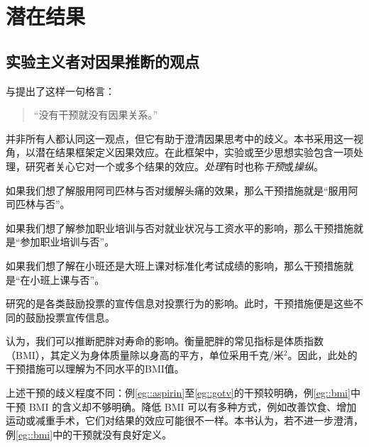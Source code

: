 \chapter{潜在结果}
 \label{chapter::potential-outcomes}


\section{实验主义者对因果推断的观点}






\citet{rubin1975bayesian}与\citet{holland1986statistics}提出了这样一句格言：
\begin{quote}
“没有干预就没有因果关系。”
\end{quote}
并非所有人都认同这一观点，但它有助于澄清因果思考中的歧义。本书采用这一视角，以潜在结果框架定义因果效应\citep{Neyman:1923, Rubin:1974}。在此框架中，实验或至少思想实验包含一项处理，研究者关心它对一个或多个结果的效应。{\it 处理}有时也称{\it 干预}或{\it 操纵}。 


\begin{example}\label{eg::aspirin}
如果我们想了解服用阿司匹林与否对缓解头痛的效果，那么干预措施就是“服用阿司匹林与否”。 
\end{example}



\begin{example}\label{eg::jobtraining}
如果我们想了解参加职业培训与否对就业状况与工资水平的影响，那么干预措施就是“参加职业培训与否”。
\end{example}


\begin{example}\label{eg::classroom}
如果我们想了解在小班还是大班上课对标准化考试成绩的影响，那么干预措施就是“在小班上课与否”。 
\end{example} 

\begin{example}\label{eg::gotv}
\citet{gerber2008social}研究的是各类鼓励投票的宣传信息对投票行为的影响。此时，干预措施便是这些不同的鼓励投票宣传信息。 
\end{example} 


\begin{example}\label{eg::bmi}
\citet{pearl2018does}认为，我们可以推断肥胖对寿命的影响。衡量肥胖的常见指标是体质指数（BMI），其定义为身体质量除以身高的平方，单位采用千克/米$^2$。因此，此处的干预措施可以理解为不同水平的BMI值。
\end{example} 


上述干预的歧义程度不同：例\ref{eg::aspirin}至\ref{eg::gotv}的干预较明确，例\ref{eg::bmi}中干预 BMI 的含义却不够明确。降低 BMI 可以有多种方式，例如改善饮食、增加运动或减重手术，它们对结果的效应可能很不一样。本书认为，若不进一步澄清，例\ref{eg::bmi}中的干预就没有良好定义。

